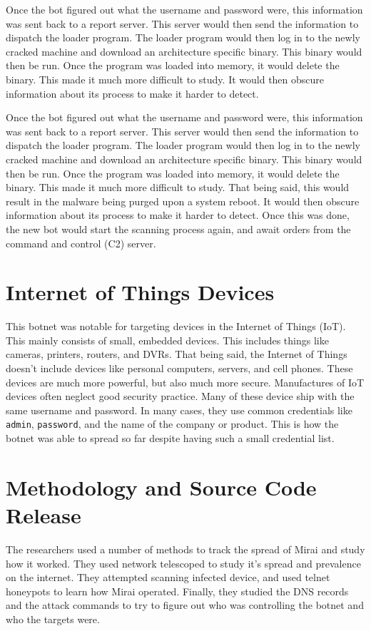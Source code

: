 \documentclass[conference]{IEEEtran}
\begin{document}
Once the bot figured out what the username and password were, this information was sent back to a report server. This server would then send the information to dispatch the loader program. The loader program would then log in to the newly cracked machine and download an architecture specific binary. This binary would then be run. Once the program was loaded into memory, it would delete the binary. This made it much more difficult to study. It would then obscure information about its process to make it harder to detect. 

Once the bot figured out what the username and password were, this information was sent back to a report server. This server would then send the information to dispatch the loader program. The loader program would then log in to the newly cracked machine and download an architecture specific binary. This binary would then be run. Once the program was loaded into memory, it would delete the binary. This made it much more difficult to study. That being said, this would result in the malware being purged upon a system reboot. It would then obscure information about its process to make it harder to detect.  Once this was done, the new bot would start the scanning process again, and await orders from the command and control (C2) server.

\section{Internet of Things Devices}

This botnet was notable for targeting devices in the Internet of Things (IoT). This mainly consists of small, embedded devices. This includes things like cameras, printers, routers, and DVRs. That being said, the Internet of Things doesn't include devices like personal computers, servers, and cell phones. These devices are much more powerful, but also much more secure. Manufactures of IoT devices often neglect good security practice. Many of these device ship with the same username and password. In many cases, they use common credentials like \verb|admin|, \verb|password|, and the name of the company or product. This is how the botnet was able to spread so far despite having such a small credential list.

\section{Methodology and Source Code Release}

The researchers used a number of methods to track the spread of Mirai and study how it worked. They used network telescoped to study it's spread and prevalence on the internet. They attempted scanning infected device, and used telnet honeypots to learn how Mirai operated. Finally, they studied the DNS records and the attack commands to try to figure out who was controlling the botnet and who the targets were.
\end{document}
